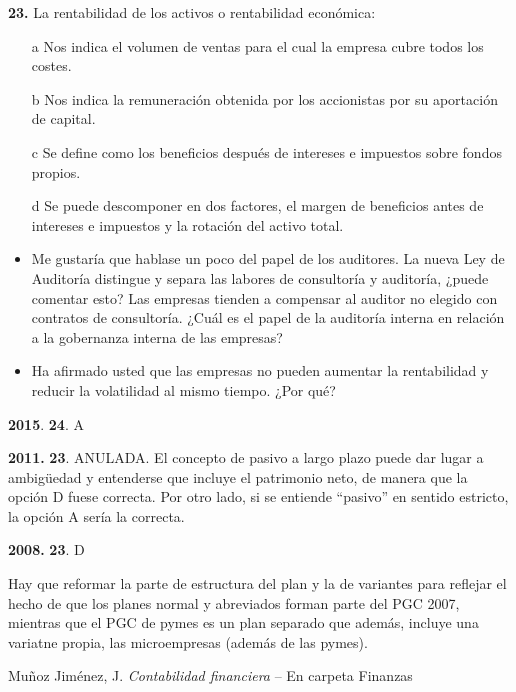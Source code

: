 \documentclass{nuevotema}
\begin{document}
\textbf{23.} La rentabilidad de los activos o rentabilidad económica:

\begin{enumerate}
	\item[a] Nos indica el volumen de ventas para el cual la empresa cubre todos los costes.
	\item[b] Nos indica la remuneración obtenida por los accionistas por su aportación de capital.
	\item[c] Se define como los beneficios después de intereses e impuestos sobre fondos propios.
	\item[d] Se puede descomponer en dos factores, el margen de beneficios antes de intereses e impuestos y la rotación del activo total.
\end{enumerate}


\begin{itemize}
    \item Me gustaría que hablase un poco del papel de los auditores. La nueva Ley de Auditoría distingue y separa las labores de consultoría y auditoría, ¿puede comentar esto? Las empresas tienden a compensar al auditor no elegido con contratos de consultoría. ¿Cuál es el papel de la auditoría interna en relación a la gobernanza interna de las empresas?
    \item Ha afirmado usted que las empresas no pueden aumentar la rentabilidad y reducir la volatilidad al mismo tiempo. ¿Por qué?
\end{itemize}

\notas

\textbf{2015}. \textbf{24}. A

\textbf{2011.} \textbf{23}. ANULADA. El concepto de pasivo a largo plazo puede dar lugar a ambigüedad y entenderse que incluye el patrimonio neto, de manera que la opción D fuese correcta. Por otro lado, si se entiende ``pasivo'' en sentido estricto, la opción A sería la correcta.

\textbf{2008.} \textbf{23}. D

Hay que reformar la parte de estructura del plan y la de variantes para reflejar el hecho de que los planes normal y abreviados forman parte del PGC 2007, mientras que el PGC de pymes es un plan separado que además, incluye una variatne propia, las microempresas (además de las pymes).

\bibliografia

Muñoz Jiménez, J. \textit{Contabilidad financiera} -- En carpeta Finanzas
\end{document}
